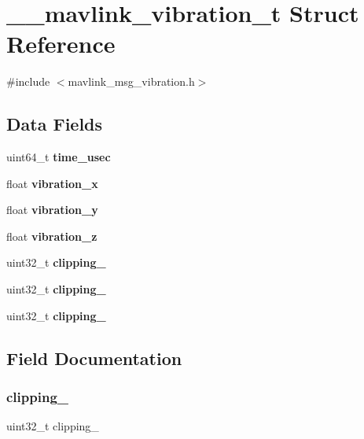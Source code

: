 \section{\+\_\+\+\_\+mavlink\+\_\+vibration\+\_\+t Struct Reference}
\label{struct____mavlink__vibration__t}


{\ttfamily \#include $<$mavlink\+\_\+msg\+\_\+vibration.\+h$>$}

\subsection*{Data Fields}
\begin{DoxyCompactItemize}
\item 
uint64\+\_\+t \textbf{ time\+\_\+usec}
\item 
float \textbf{ vibration\+\_\+x}
\item 
float \textbf{ vibration\+\_\+y}
\item 
float \textbf{ vibration\+\_\+z}
\item 
uint32\+\_\+t \textbf{ clipping\+\_}
\item 
uint32\+\_\+t \textbf{ clipping\+\_}
\item 
uint32\+\_\+t \textbf{ clipping\+\_}
\end{DoxyCompactItemize}


\subsection{Field Documentation}
\mbox{\label{struct____mavlink__vibration__t_a8154c9a4fa71552657a3915096eecbe7}} 
\subsubsection{clipping\+\_}
{\footnotesize\ttfamily uint32\+\_\+t clipping\+\_}

\mbox{\label{struct____mavlink__vibration__t_aba086a2b7479dac098a740bdd6317036}} 
